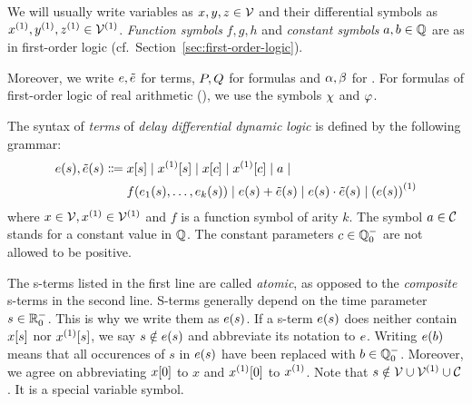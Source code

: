     We will usually write variables as $x,y,z\in\mathcal{V}$ and their differential symbols as $\D{x},\D{y},\D{z}\in\diffvars$.
    \emph{Function symbols} $f,g,h$ and \emph{constant symbols} $a,b\in\mathbb{Q}$
    are as in first-order logic (cf.\ Section~\ref{sec:first-order-logic}).

    Moreover, we write $e,\tilde{e}$ for \ddL terms, $P,Q$ for \ddL formulas and $\alpha,\beta$ for \dHPs. For formulas of first-order logic of real arithmetic (\FOLR), we use the symbols $\chi$ and $\varphi$.

    \begin{definition}[s-Terms]\label{def:syntax-terms}
        The syntax of \emph{terms} of \emph{delay differential dynamic logic} is defined by the following grammar:
        \begin{align*}
            \astrm(s),\bstrm(s) \Coloneqq{}&
                \x[s] \mid
                \Dx[s] \mid
                \x[c] \mid
                \Dx[c] \mid
                a \mid\\
                & f(\range{\istrm{1}(s)}{\istrm{k}(s)}) \mid
                \astrm(s) + \bstrm(s) \mid
                \astrm(s) \cdot \bstrm(s) \mid
                \D{(\astrm(s))}
        \end{align*}
        where $x\in\allvars,\D{x}\in\diffvars$ and $f$ is a function symbol of arity $k$.
        The symbol $a\in\mathcal{C}_{}$ stands for a constant value in $\mathbb{Q}$. The constant parameters $c\in\mathbb{Q}^-_0$ are not allowed to be positive.
    \end{definition}

    The s-terms listed in the first line are called \emph{atomic}, as opposed to the \emph{composite} s-terms in the second line.
    S-terms generally depend on the time parameter $s\in\mathbb{R}^-_0$. This is why we write them as $e(s)$.
    If a s-term $e(s)$ does neither contain $x[s]$ nor $\Dx[s]$, we say $s\notin e(s)$ and abbreviate its notation to $e$.
    Writing $e(b)$ means that all occurences of $s$ in $e(s)$ have been replaced with $b\in\mathbb{Q}^-_0$.
    Moreover, we agree on abbreviating $x[0]$ to $x$ and $\Dx[0]$ to $\D{x}$.
    Note that $s\notin\allvars\cup\diffvars\cup\constants$. It is a special variable symbol.

